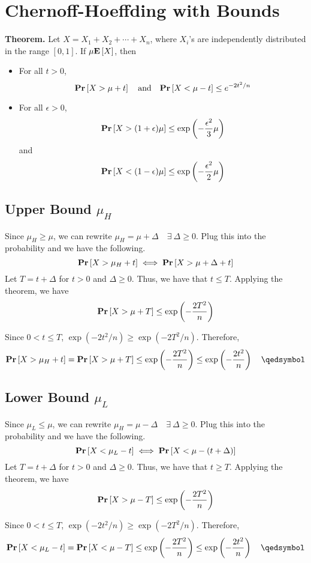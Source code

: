\chapter{Chernoff-Hoeffding with Bounds}

\begin{tcolorbox}
\textbf{Theorem.} Let $X = X_1 + X_2 + \cdots + X_n$, where $X_i$'s are independently distributed in the range $[0, 1]$. If $\mu\mathbf{E}\left[X\right]$, then
\begin{itemize}
	\item For all $t > 0$, \[ \mathbf{Pr}\left[X > \mu + t\right]\quad\text{and}\quad \mathbf{Pr}\left[X < \mu - t\right] \leq e^{-2t^2/n} \]
	\item For all $\epsilon > 0$, \[ \mathbf{Pr}\left[X > (1 + \epsilon)\mu\right] \leq \exp\left(- \frac{\epsilon^2}{3}\mu\right) \]
		and \[ \mathbf{Pr}\left[X < (1 - \epsilon)\mu\right] \leq \exp\left(-\frac{\epsilon^2}{2}\mu\right) \]
\end{itemize}
\end{tcolorbox}

\section{Upper Bound $\mu_H$}

Since $\mu_H \geq \mu$, we can rewrite $\mu_H = \mu + \Delta\quad\exists\ \Delta \geq 0$. Plug this into the probability and we have the following.
\[ \mathbf{Pr}\left[X > \mu_H + t\right] \iff \mathbf{Pr}\left[X > \mu + \Delta + t\right] \]
Let $T = t + \Delta$ for $t > 0$ and $\Delta \geq 0$. Thus, we have that $t \leq T$. Applying the theorem, we have
\[ \mathbf{Pr}\left[X > \mu + T\right] \leq \exp\left(- \frac{2T^2}{n}\right) \]

Since $0 < t \leq T$, $\exp(-2t^2 / n) \geq \exp(-2T^2 / n)$. Therefore,
\[ \pr{X > \mu_H + t} = \pr{X > \mu + T} \leq \exp\left(- \frac{2T^2}{n}\right) \leq \exp\left(-\frac{2t^2}{n}\right) \quad \qedsymbol \]


\section{Lower Bound $\mu_L$}

Since $\mu_L \leq \mu$, we can rewrite $\mu_H = \mu - \Delta\quad\exists\ \Delta \geq 0$. Plug this into the probability and we have the following.
\[ \mathbf{Pr}\left[X < \mu_L - t\right] \iff \mathbf{Pr}\left[X < \mu - (t + \Delta)\right] \]
Let $T = t + \Delta$ for $t > 0$ and $\Delta \geq 0$. Thus, we have that $t \geq T$. Applying the theorem, we have
\[ \mathbf{Pr}\left[X > \mu - T\right] \leq \exp\left(- \frac{2T^2}{n}\right) \]

Since $0 < t \leq T$, $\exp(-2t^2 / n) \geq \exp(-2T^2 / n)$. Therefore,
\[ \pr{X < \mu_L - t} = \pr{X < \mu - T} \leq \exp\left(- \frac{2T^2}{n}\right) \leq \exp\left(-\frac{2t^2}{n}\right) \quad\qedsymbol \]
